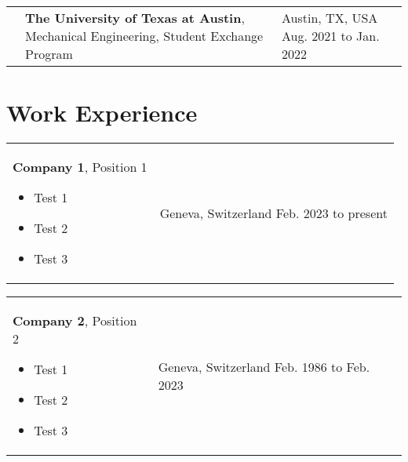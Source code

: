 \documentclass[10pt, a4paper]{article}
\newenvironment{highlights}{
        \begin{itemize}[
                topsep=0pt,
                parsep=0.07 cm,
                partopsep=0pt,
                itemsep=0pt,
                after=\vspace*{-1\baselineskip},
                leftmargin=0.6 cm + 3pt
            ]
    }{
        \end{itemize}
    } %
\begin{document}
        \vspace*{0.12 cm}
        
        \begin{tabularx}{\textwidth}{p{0.55cm} K{0.2 cm} R{3.6 cm}}
            \textbf{}
            & 
            \textbf{The University of Texas at Austin}, Mechanical Engineering, Student Exchange Program
            \vspace*{0.12 cm}
        &
            Austin, TX, USA  \hspace*{-0.2cm + 0.2 cm} \newline
            Aug. 2021 to Jan. 2022 \hspace*{-0.2cm + 0.2 cm}
        \end{tabularx}



    \section{Work Experience}
    
        \begin{tabularx}{\textwidth}{K{0.2 cm} R{3.6 cm}}
            \textbf{Company 1}, Position 1
            \vspace*{0.12 cm}
            \begin{highlights}
                \item Test 1
                \item Test 2
                \item Test 3
            \end{highlights}
        &
            Geneva, Switzerland  \hspace*{-0.2cm + 0.2 cm} \newline
            Feb. 2023 to present \hspace*{-0.2cm + 0.2 cm}
        \end{tabularx}

        \vspace*{0.12 cm}
        
        \begin{tabularx}{\textwidth}{K{0.2 cm} R{3.6 cm}}
            \textbf{Company 2}, Position 2
            \vspace*{0.12 cm}
            \begin{highlights}
                \item Test 1
                \item Test 2
                \item Test 3
            \end{highlights}
        &
            Geneva, Switzerland  \hspace*{-0.2cm + 0.2 cm} \newline
            Feb. 1986 to Feb. 2023 \hspace*{-0.2cm + 0.2 cm}
        \end{tabularx}
\end{document}
